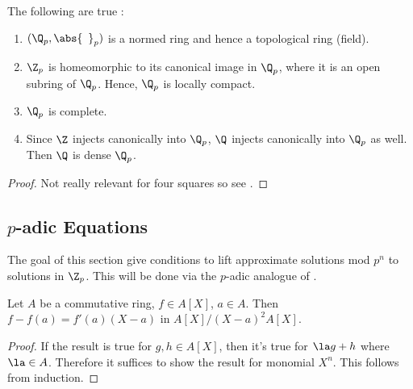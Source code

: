 \begin{prop}
  
  The following are true : 
  \begin{enumerate}
    \item $(\Q_p,\abs{\hspace{5pt}}_p)$ is a normed ring 
    and hence a topological ring (field). 
    \item $\Z_p$ is homeomorphic to its canonical image in $\Q_p$,
    where it is an open subring of $\Q_p$.
    Hence, $\Q_p$ is locally compact. 
    \item $\Q_p$ is complete. 
    \item Since $\Z$ injects canonically into $\Q_p$, 
    $\Q$ injects canonically into $\Q_p$ as well. 
    Then $\Q$ is dense $\Q_p$.
  \end{enumerate}
\end{prop}
\begin{proof}
  Not really relevant for four squares so see . 
\end{proof}

\subsection{\texorpdfstring{$p$-adic Equations}{TEXT}}

The goal of this section give 
conditions to lift approximate solutions mod $p^n$ to solutions in $\Z_p$. 
This will be done via the $p$-adic analogue of 
.

\begin{prop}
  Let $A$ be a commutative ring, $f \in A[X]$, $a \in A$. 
  Then $f - f(a) = f'(a)(X - a)$ in $A[X]/(X-a)^2A[X]$. 
\end{prop}
\begin{proof}
  If the result is true for $g, h \in A[X]$,
  then it's true for $\la g + h$ where $\la \in A$. 
  Therefore it suffices to show the result for monomial $X^n$. 
  This follows from induction. 
\end{proof}

